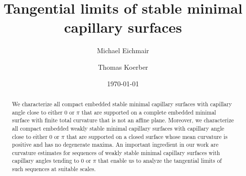 \documentclass[11pt]{amsart}
\title[Tangential limits of stable minimal capillary surfaces]{ 
	Tangential limits of stable minimal capillary surfaces}
\author{Michael Eichmair}
\author{Thomas Koerber}
\begin{document}
		\date{\today}
	\maketitle
\begin{abstract}
We characterize all compact embedded stable minimal capillary surfaces with capillary angle close to either $0$ or $\pi$ that are supported on a complete embedded minimal surface with finite total curvature that is not an affine plane. Moreover, we characterize all compact embedded weakly stable minimal capillary surfaces with capillary angle close to either $0$ or $\pi$ that are supported on a closed surface whose mean curvature is positive and has no degenerate maxima. An important ingredient in our work are curvature estimates for sequences of  weakly stable minimal capillary surfaces with capillary angles tending to $0$ or $\pi$ that enable us to analyze the tangential limits of such sequences at suitable scales.

\end{abstract}
\end{document}
